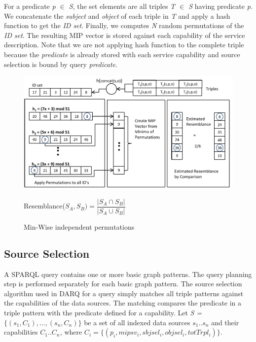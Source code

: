 \documentclass{sig-alternate}  %
\begin{document}
For a predicate \emph{p $\in$ S}, the set elements are all triples \emph{T $\in$
S} having predicate \emph{p}. We concatenate the \emph{subject}  and \emph{object} of each triple in \emph{T} and apply a hash function to get the \emph{ID set}. Finally, we computes \emph{N} random permutations of the \emph{ID set}. The resulting
MIP vector is stored against each capability of the service description. Note that we are not applying hash function to the complete triple because the \emph{predicate} is already stored with each service capability and source selection is bound by query \emph{predicate}.

\begin{figure}
\begin{centering}
\includegraphics[scale=0.5]{img/mips} 
\par\end{centering}
\centering Resemblance($S_A,S_B) = \dfrac{|S_A \cap S_B|}{|S_A \cup S_B|}$\\

\caption{Min-Wise independent permutations}
\end{figure}

\subsection{Source Selection}
A SPARQL query contains one or more basic graph patterns. The query planning
step is performed separately for each basic graph pattern.
The source selection algorithm used in DARQ for
a query simply matches all triple patterns against the capabilities
of the data sources. The matching compares the predicate in a triple
pattern with the predicate defined for a capability. Let \emph{S =$\{(s_1,C_1),...,(s_n,C_n)\}$ } be a set of all indexed data sources \emph{$s_1..s_n$} and their capabilities \emph{$C_1..C_n$,} where \emph{$C_i = \{(p_i,mipsv_i,sbjsel_i,objsel_i,totTrpl_i)\}$}.
\end{document}
